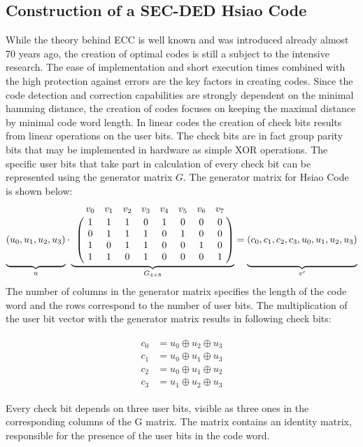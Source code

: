 \subsection{Construction of a SEC-DED Hsiao Code}\label{sec:Hsiao}
While the theory behind ECC is well known and was introduced already almost 70 years ago, the creation of optimal codes is still a subject to the intensive research. The ease of implementation and short execution times combined with the high protection against errors are the key factors in creating codes. Since the code detection and correction capabilities are strongly dependent on the minimal hamming distance, the creation of codes focuses on keeping the maximal distance by minimal code word length. In linear codes the creation of check bits results from linear operations on the user bits. The check bits are in fact group parity bits that may be implemented in hardware as simple XOR operations. The specific user bits that take part in calculation of every check bit can be represented using the generator matrix $G$. The generator matrix for Hsiao Code is shown below:
\begin{equation*}
\underbrace{
\vphantom{\bordermatrix{&&&&&&&&\cr &1&0&0&0&1&1&1&0\cr&0&1&0&0&0&1&1&1\cr&0&0&1&0&1&0&1&1\cr&0&0&0&1&1&1&0&1\cr}
}(u_0,u_1,u_2,u_3)}_{u}
\cdot 
\underbrace{\bordermatrix{
&v_0&v_1&v_2&v_3&v_4&v_5&v_6&v_7\cr 
&1&1&1&0&1&0&0&0\cr
&0&1&1&1&0&1&0&0\cr
&1&0&1&1&0&0&1&0\cr
&1&1&0&1&0&0&0&1\cr
}}_{G_{4\times 8}} = 
\underbrace{
\vphantom{\bordermatrix{&&&&&&&&\cr &1&0&0&0&1&1&1&0\cr&0&1&0&0&0&1&1&1\cr&0&0&1&0&1&0&1&1\cr&0&0&0&1&1&1&0&1\cr}
}(c_0,c_1,c_2,c_3,u_0,u_1,u_2,u_3)}_{v'}
\end{equation*}
The number of columns in the generator matrix specifies the length of the code word and the rows correspond to the number of user bits. The multiplication of the user bit vector with the generator matrix results in following check bits: 

\begin{align}
\begin{aligned}
c_0 &= u_0 \oplus u_2 \oplus u_3  \\
c_1 &= u_0 \oplus u_1 \oplus u_3  \\
c_2 &= u_0 \oplus u_1 \oplus u_2  \\
c_3 &= u_1 \oplus u_2 \oplus u_3 
\end{aligned}
\end{align}

Every check bit depends on three user bits, visible as three ones in the corresponding columns of the G matrix. The matrix contains an identity matrix, responsible for the presence of the user bits in the code word.

